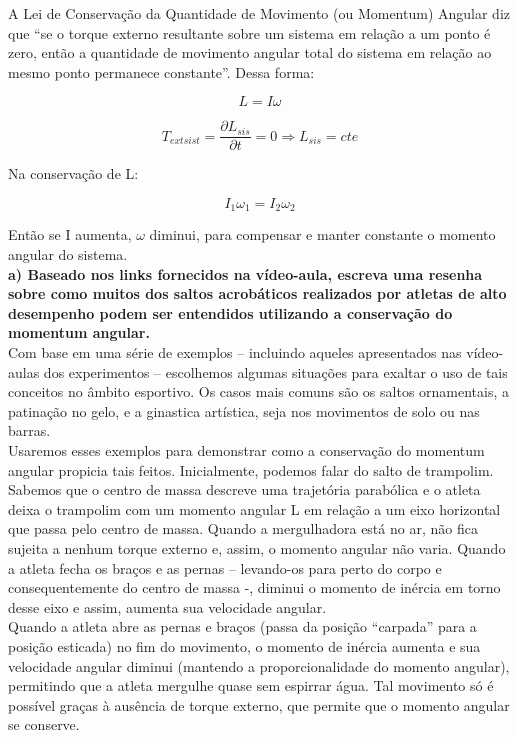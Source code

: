A Lei de Conservação da Quantidade de Movimento (ou Momentum) Angular diz que “se o torque externo resultante sobre um sistema em relação a um ponto é zero, então a quantidade de movimento angular total do sistema em relação ao mesmo ponto permanece constante”. Dessa forma: 

\[L = I  \omega\]

\[T_{ext sist} = \frac{\partial L_{sis}}{\partial t} = 0 \Rightarrow L_{sis} = cte\]

Na conservação de L: 

\[I_1 \omega _1 = I_2 \omega _2 \]

Então se I aumenta, $\omega$ diminui, para compensar e manter constante o momento angular do sistema.\\
 
\textbf{a) Baseado nos links fornecidos na vídeo-aula, escreva uma resenha sobre como muitos dos saltos acrobáticos realizados por atletas de alto desempenho podem ser entendidos utilizando a conservação do momentum angular.}\\

Com base em uma série de exemplos – incluindo aqueles apresentados nas vídeo-aulas dos experimentos – escolhemos algumas situações para exaltar o uso de tais conceitos no âmbito esportivo. Os casos mais comuns são os saltos ornamentais, a patinação no gelo, e a ginastica artística, seja nos movimentos de solo ou nas barras.\\

Usaremos esses exemplos para demonstrar como a conservação do momentum angular propicia tais feitos. Inicialmente, podemos falar do salto de trampolim. Sabemos que o centro de massa descreve uma trajetória parabólica e o atleta deixa o trampolim com um momento angular L em relação a um eixo horizontal que passa pelo centro de massa. Quando a mergulhadora está no ar, não fica sujeita a nenhum torque externo e, assim, o momento angular não varia. Quando a atleta fecha os braços e as pernas – levando-os para perto do corpo e consequentemente do centro de massa -, diminui o momento de inércia em torno desse eixo e assim, aumenta sua velocidade angular.\\

Quando a atleta abre as pernas e braços (passa da posição “carpada” para a posição esticada) no fim do movimento, o momento de inércia aumenta e sua velocidade angular diminui (mantendo a proporcionalidade do momento angular), permitindo que a atleta mergulhe quase sem espirrar água. Tal movimento só é possível graças à ausência de torque externo, que permite que o momento angular se conserve. \\

